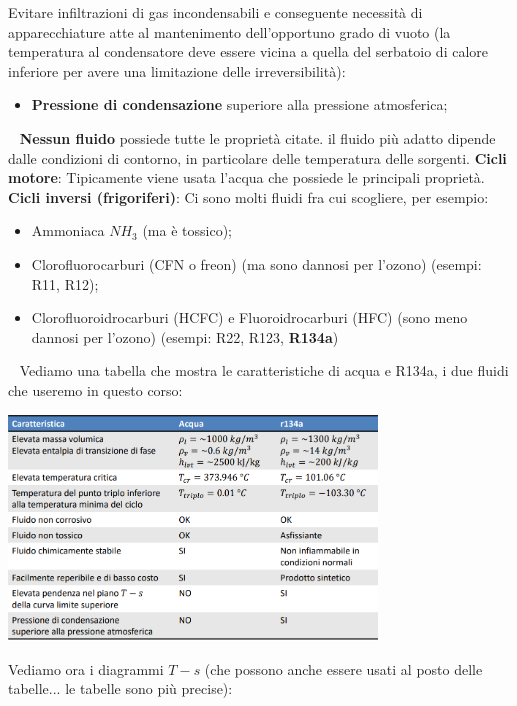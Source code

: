 Evitare infiltrazioni di gas incondensabili e conseguente necessità di apparecchiature atte al mantenimento dell'opportuno grado di vuoto (la temperatura al condensatore deve essere vicina a quella del serbatoio di calore inferiore per avere una limitazione delle irreversibilità):
\begin{itemize}
    \item \textbf{Pressione di condensazione} superiore alla pressione atmosferica;
\end{itemize}
\ \newline
\textbf{Nessun fluido} possiede tutte le proprietà citate. il fluido più adatto dipende dalle condizioni di contorno, in particolare delle temperatura delle sorgenti.\newline
\newline
\textbf{Cicli motore}: Tipicamente viene usata l'acqua che possiede le principali proprietà.\newline
\newline
\textbf{Cicli inversi (frigoriferi)}: Ci sono molti fluidi fra cui scogliere, per esempio:
\begin{itemize}
    \item Ammoniaca $NH_3$ (ma è tossico);
    \item Clorofluorocarburi (CFN o freon) (ma sono dannosi per l'ozono) (esempi: R11, R12);
    \item Clorofluoroidrocarburi (HCFC) e Fluoroidrocarburi (HFC) (sono meno dannosi per l'ozono) (esempi: R22, R123, \textbf{R134a})
\end{itemize}
\ \newline
Vediamo una tabella che mostra le caratteristiche di acqua e R134a, i due fluidi che useremo in questo corso:
\begin{center}
    \includegraphics[height=6cm]{../L08/img2.PNG}
\end{center}
Vediamo ora i diagrammi $T-s$ (che possono anche essere usati al posto delle tabelle... le tabelle sono più precise):
